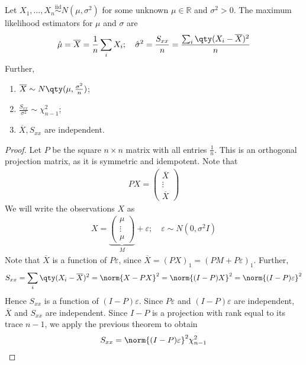 \begin{theorem}
	Let $X_1, \dots, X_n \overset{\text{iid}}{\sim} N(\mu,\sigma^2)$ for some unknown $\mu \in \mathbb R$ and $\sigma^2 > 0$.
	The maximum likelihood estimators for $\mu$ and $\sigma$ are
	\begin{align*}
		\hat \mu = \overline X = \frac{1}{n} \sum_i X_i;\quad \hat \sigma^2 = \frac{S_{xx}}{n} = \frac{\sum_i \qty(X_i - \overline X)^2}{n}
	\end{align*}
	Further,
	\begin{enumerate}
		\item $\overline X \sim N\qty(\mu, \frac{\sigma^2}{n})$;
		\item $\frac{S_{xx}}{\sigma^2} \sim \chi^2_{n-1}$;
		\item $\overline X, S_{xx}$ are independent.
	\end{enumerate}
\end{theorem}
\begin{proof}
	Let $P$ be the square $n \times n$ matrix with all entries $\frac{1}{n}$.
	This is an orthogonal projection matrix, as it is symmetric and idempotent.
	Note that
	\begin{align*}
		PX = \begin{pmatrix}
			\overline X \\
			\vdots      \\
			\overline X
		\end{pmatrix}
	\end{align*}
	We will write the observations $X$ as
	\begin{align*}
		X = \underbrace{\begin{pmatrix}
				\mu    \\
				\vdots \\
				\mu
			\end{pmatrix}}_{M} + \varepsilon;\quad \varepsilon \sim N(0,\sigma^2 I)
	\end{align*}
	Note that $\overline X$ is a function of $P \varepsilon$, since $\overline X = (PX)_1 = (PM + P\varepsilon)_1$.
	Further,
	\begin{align*}
		S_{xx} = \sum_i \qty(X_i - \overline X)^2 = \norm{X - PX}^2 = \norm{(I-P)X}^2 = \norm{(I-P)\varepsilon}^2
	\end{align*}
	Hence $S_{xx}$ is a function of $(I-P)\varepsilon$.
	Since $P\varepsilon$ and $(I-P)\varepsilon$ are independent, $\overline X$ and $S_{xx}$ are independent.
	Since $I-P$ is a projection with rank equal to its trace $n-1$, we apply the previous theorem to obtain
	\begin{align*}
		S_{xx} = \norm{(I-P)\varepsilon}^2 \chi^2_{n-1}
	\end{align*}
\end{proof}

